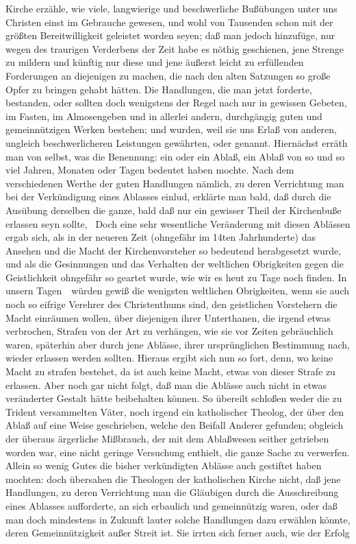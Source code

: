 \begin{RWanm}
Kirche erzähle, wie viele, langwierige und beschwerliche Bußübungen unter uns Christen einst im Gebrauche gewesen, und wohl von Tausenden schon mit der größten Bereitwilligkeit geleistet worden seyen; daß man jedoch hinzufüge, nur wegen des traurigen Verderbens der Zeit habe es nöthig geschienen, jene Strenge zu mildern und künftig nur diese und jene äußerst leicht zu erfüllenden Forderungen an diejenigen zu machen, die nach den alten Satzungen so große Opfer zu bringen gehabt hätten. Die Handlungen, die man jetzt forderte, bestanden, oder sollten doch wenigstens der Regel nach nur in gewissen Gebeten, im Fasten, im Almosengeben und in allerlei andern, durchgängig guten und gemeinnützigen Werken bestehen; und wurden, weil sie uns Erlaß von anderen, ungleich beschwerlicheren Leistungen gewährten,  oder  genannt. Hiernächst erräth man von selbst, was die Benennung: ein  oder ein  Ablaß, ein Ablaß von so und so viel Jahren, Monaten oder Tagen bedeutet haben mochte. Nach dem verschiedenen Werthe der guten Handlungen nämlich, zu deren Verrichtung man bei der Verkündigung eines Ablasses einlud, erklärte man bald, daß durch die Ausübung derselben die ganze, bald daß nur ein gewisser Theil der Kirchenbuße erlassen seyn sollte, \usw\ Doch eine sehr wesentliche Veränderung mit diesen Ablässen ergab sich, als in der neueren Zeit (ohngefähr im 14ten Jahrhunderte) das Ansehen und die Macht der Kirchenvorsteher so bedeutend herabgesetzt wurde, und als die Gesinnungen und das Verhalten der weltlichen Obrigkeiten gegen die Geistlichkeit ohngefähr so geartet wurde, wie wir es heut zu Tage noch finden. In unsern Tagen~\ würden gewiß die wenigsten weltlichen Obrigkeiten, wenn sie auch noch so eifrige Verehrer des Christenthums sind, den geistlichen Vorstehern die Macht einräumen wollen, über diejenigen ihrer Unterthanen, die irgend etwas verbrochen, Strafen von der Art zu verhängen, wie sie vor Zeiten gebräuchlich waren, späterhin aber durch jene Ablässe, ihrer ursprünglichen Bestimmung nach, wieder erlassen werden sollten. Hieraus ergibt sich nun so fort,  denn, wo keine Macht zu strafen bestehet, da ist auch keine Macht, etwas von dieser Strafe zu erlassen. Aber noch gar nicht folgt, daß man die Ablässe auch nicht in etwas veränderter Gestalt hätte beibehalten können. So übereilt schloßen weder die zu Trident versammelten Väter, noch irgend ein katholischer Theolog, der über den Ablaß auf eine Weise geschrieben, welche den Beifall Anderer gefunden; obgleich der überaus ärgerliche Mißbrauch, der mit dem Ablaßwesen seither getrieben worden war, eine nicht geringe Versuchung enthielt, die ganze Sache zu verwerfen. Allein so wenig Gutes die bisher verkündigten Ablässe auch gestiftet haben mochten: doch übersahen die Theologen der katholischen Kirche nicht, daß jene Handlungen, zu deren Verrichtung man die Gläubigen durch die Ausschreibung eines Ablasses aufforderte, an sich erbaulich und gemeinnützig waren, oder daß man doch mindestens in Zukunft lauter solche Handlungen dazu erwählen könnte, deren Gemeinnützigkeit außer Streit ist. Sie irrten sich ferner auch, wie der Erfolg 
\end{RWanm}
